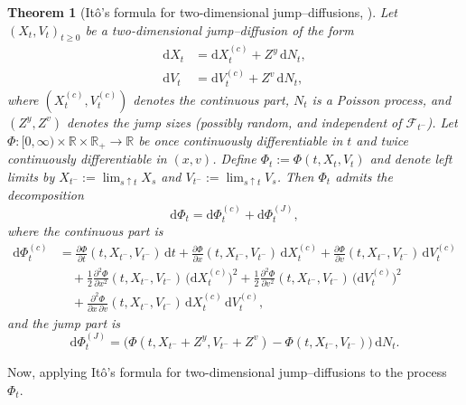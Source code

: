\documentclass[a4paper,titlepage,12pt]{report}
\theoremstyle{plain}
\newtheorem*{theorem*}{Theorem}
\begin{document}
\begin{theorem*}[It\^{o}'s formula for two-dimensional jump--diffusions, \citep{OksendalSulem2007}]
\label{thm:ito_2d_jump}
Let $(X_t,V_t)_{t\ge 0}$ be a two-dimensional jump--diffusion of the form
\begin{align}
\mathrm{d}X_t &= \mathrm{d}X_t^{(c)} + Z^y\,\mathrm{d}N_t,\\
\mathrm{d}V_t &= \mathrm{d}V_t^{(c)} + Z^v\,\mathrm{d}N_t,
\end{align}
where $(X_t^{(c)},V_t^{(c)})$ denotes the continuous part, $N_t$ is a Poisson process,
and $(Z^y,Z^v)$ denotes the jump sizes (possibly random, and independent of $\mathcal F_{t^-}$).
Let $\Phi:[0,\infty)\times\mathbb R\times\mathbb R_+\to\mathbb R$ be once continuously differentiable
in $t$ and twice continuously differentiable in $(x,v)$. Define $\Phi_t:=\Phi(t,X_t,V_t)$ and denote
left limits by $X_{t^-}:=\lim_{s\uparrow t}X_s$ and $V_{t^-}:=\lim_{s\uparrow t}V_s$.
Then $\Phi_t$ admits the decomposition
\begin{equation}
\mathrm{d}\Phi_t
=
\mathrm{d}\Phi_t^{(c)}
+
\mathrm{d}\Phi_t^{(J)},
\end{equation}
where the continuous part is
\begin{align}
\mathrm{d}\Phi_t^{(c)}
&=
\frac{\partial \Phi}{\partial t}(t,X_{t^-},V_{t^-})\,\mathrm{d}t
+
\frac{\partial \Phi}{\partial x}(t,X_{t^-},V_{t^-})\,\mathrm{d}X_t^{(c)}
+
\frac{\partial \Phi}{\partial v}(t,X_{t^-},V_{t^-})\,\mathrm{d}V_t^{(c)}
\nonumber\\
&\quad
+
\frac{1}{2}\frac{\partial^2 \Phi}{\partial x^2}(t,X_{t^-},V_{t^-})\,\big(\mathrm{d}X_t^{(c)}\big)^2
+
\frac{1}{2}\frac{\partial^2 \Phi}{\partial v^2}(t,X_{t^-},V_{t^-})\,\big(\mathrm{d}V_t^{(c)}\big)^2
\nonumber\\
&\quad
+
\frac{\partial^2 \Phi}{\partial x\,\partial v}(t,X_{t^-},V_{t^-})\,\mathrm{d}X_t^{(c)}\,\mathrm{d}V_t^{(c)},
\label{eq:ito_2d_cont}
\end{align}
and the jump part is
\begin{equation}
\mathrm{d}\Phi_t^{(J)}
=
\Big(
\Phi(t,X_{t^-}+Z^y,V_{t^-}+Z^v)
-
\Phi(t,X_{t^-},V_{t^-})
\Big)\,\mathrm{d}N_t.
\label{eq:ito_2d_jump}
\end{equation}
\end{theorem*}

Now, applying It\^{o}'s formula for two-dimensional jump--diffusions to the process $\Phi_t$.
\end{document}
